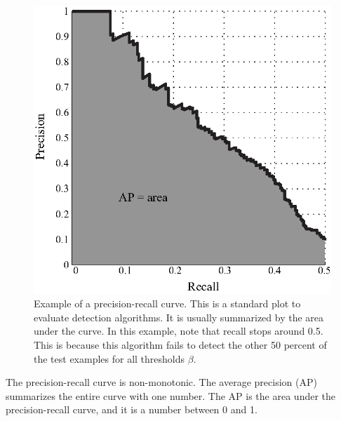 \begin{figure}
\centerline{
\includegraphics[width=.4\linewidth]{figures/object_recognition/example_precision_recall.eps}
}
\caption{Example of a precision-recall curve. This is a standard plot to evaluate detection algorithms. It is usually summarized by the area under the curve. In this example, note that recall stops around 0.5. This is because this algorithm fails to detect the other 50 percent of the test examples for all thresholds $\beta$.}
\label{fig:example_precision_recall}
\end{figure}
The precision-recall curve is non-monotonic. The average precision (AP) summarizes the entire curve with one number. The AP is the area under the precision-recall curve, and it is a number between 0 and 1.






		

